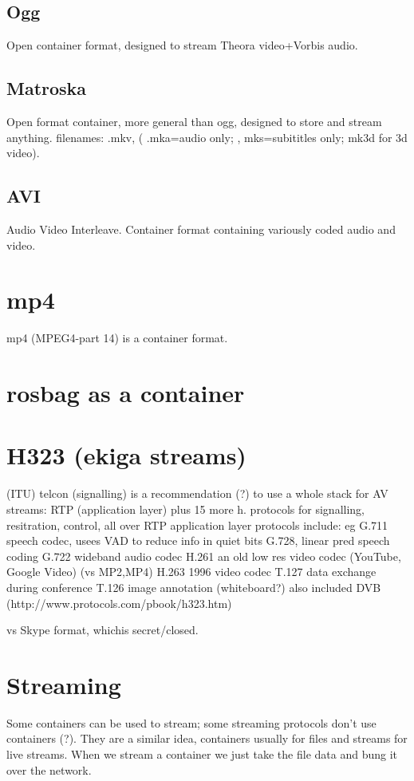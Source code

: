 \documentclass[oneside,english]{scrbook}
\begin{document}
\section{Ogg}
Open container format, designed to stream Theora video+Vorbis audio.

\section{Matroska}
Open format container, more general than ogg, designed to store and stream anything.
filenames: .mkv,  ( .mka=audio only; , mks=subititles only; mk3d for 3d video).

\section{AVI}
Audio Video Interleave. Container format containing variously coded audio and video.

\chapter{mp4}
mp4 (MPEG4-part 14) is a container format.

\chapter{rosbag as a container}

\chapter{H323 (ekiga streams)}
 (ITU) telcon  (signalling)
	is a recommendation (?) to use a whole stack for AV streams:
		RTP (application layer)		
		plus 15 more h. protocols for signalling, resitration, control, all over RTP
		application layer protocols include:
			eg G.711 speech codec, usees VAD to reduce info in quiet bits
			    G.728, linear pred speech coding
			G.722 wideband audio codec
			H.261 an old low res video codec (YouTube, Google Video) (vs MP2,MP4)
			H.263 1996 video codec
			T.127 data exchange during conference
			T.126 image annotation (whiteboard?)
		also included DVB
		(http://www.protocols.com/pbook/h323.htm)

vs Skype format, whichis secret/closed.


\chapter{Streaming}
Some containers can be used to stream; some streaming protocols don't use containers (?). They are a similar idea, containers usually for files and streams for live streams. When we stream a container we just take the file data and bung it over the network.
\end{document}
